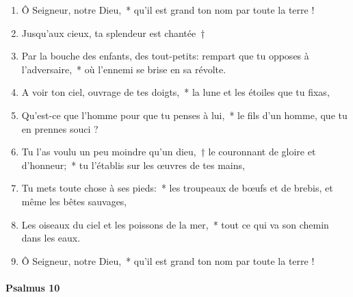 \documentclass[twoside]{article}
\begin{document}
\begin{paracol}[1]{2}

\begin{enumerate}[wide, itemsep=0mm, labelwidth=!, labelindent=0pt, label=\color{gregoriocolor}\theenumi]
\item Ô Seigneur, notre Dieu,~* qu'il est grand ton nom par toute la terre ! 
\item Jusqu'aux cieux, ta splendeur est chantée~†
\item Par la bouche des enfants, des tout-petits: rempart que tu opposes à l'adversaire,~* où l'ennemi se brise en sa révolte.
\item A voir ton ciel, ouvrage de tes doigts,~* la lune et les étoiles que tu fixas,
\item Qu'est-ce que l'homme pour que tu penses à lui,~* le fils d'un homme, que tu en prennes souci ?
\item Tu l'as voulu un peu moindre qu'un dieu,~† le couronnant de gloire et d'honneur;~* tu l'établis sur les œuvres de tes mains,
\item Tu mets toute chose à ses pieds:~* les troupeaux de bœufs et de brebis, et même les bêtes sauvages,
\item Les oiseaux du ciel et les poissons de la mer,~* tout ce qui va son chemin dans les eaux.
\item Ô Seigneur, notre Dieu,~* qu'il est grand ton nom par toute la terre !
\end{enumerate}

\switchcolumn*
\paragraph{Psalmus 10}



\end{paracol}
\end{document}
